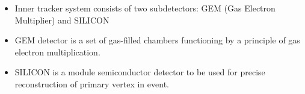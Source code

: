 \documentclass[dvipsnames, aspectratio=43] {beamer}
\begin{document}
\begin{frame}
\begin{columns}[t]
\begin{block}{\bf {}}
    \end{block}
  \end{columns}
  \begin{block}{}
    {\scriptsize
    \begin{itemize}
    \item Inner tracker system consists of two subdetectors: GEM (Gas Electron Multiplier) and SILICON
    \item GEM detector is a set of gas-filled chambers functioning by a principle of gas electron multiplication.
    \item SILICON is a module semiconductor detector to be used for precise reconstruction of primary vertex in event. 
    \end{itemize}
    }
  \end{block}
\end{frame}
\end{document}
